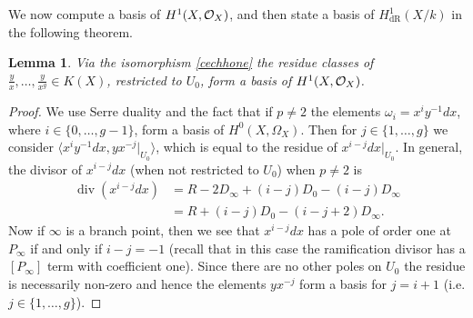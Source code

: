 \documentclass[draft, 11pt]{article} %
\theoremstyle{plain}
\newtheorem{lem}[defn]{Lemma}
\theoremstyle{remark}
\newcommand{\cO}{{\cal O}}
\newcommand{\hzero}{{H^0(X,\Omega_X)}}
\newcommand{\derhamhone}{H_{\text {dR}}^1(X/k)}
\DeclareMathOperator{\di}{div}
\begin{document}

We now compute a basis of $H^1(X,\cO_X)$, and then state a basis of $\derhamhone$ in the following theorem.
\begin{lem}\label{basish1}
 Via the isomorphism \eqref{cechhone} the residue classes of $\frac{y}{x}, \ldots , \frac{y}{x^g} \in K(X)$, restricted to $U_0$, form a basis of $H^1(X,\cO_X)$.
\end{lem}
\begin{proof}
We use Serre duality and the fact that if $p\neq 2$ the elements $\omega_i = x^iy^{-1}dx$, where $i \in \{0,\ldots, g-1\}$, form a basis of $\hzero$.
Then for $j\in \{1, \ldots, g\}$  we consider $\langle x^iy^{-1}dx, yx^{-j}|_{U_0}\rangle$, which is equal to the residue of $x^{i-j}dx|_{U_0}$.
In general, the divisor of $x^{i-j}dx$ (when not restricted to $U_0$) when $p\neq 2$ is
\begin{equation}\label{residuedivisor}
\begin{split}
\di(x^{i-j}dx) & = R - 2D_\infty +(i-j)D_0 - (i-j)D_\infty \\
& = R + (i-j)D_0 - (i-j+2)D_\infty.
\end{split}
\end{equation}
Now if $\infty$ is a branch point, then we see that $x^{i-j}dx$ has a pole of order one at $P_\infty$ if and only if $i-j = -1$ (recall that in this case the ramification divisor has a $[P_\infty]$ term with coefficient one).
Since there are no other poles on $U_0$ the residue is necessarily non-zero and hence the elements $yx^{-j}$ form a basis for $j= i+1$ (i.e. $j \in \{1, \ldots, g\}$).


\end{proof}
\end{document}
